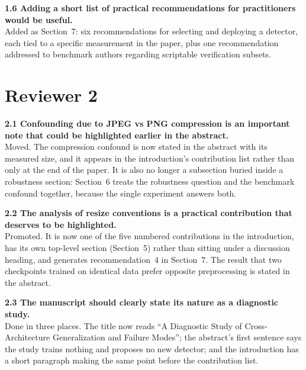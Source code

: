 \documentclass[11pt]{article}
\begin{document}
\noindent\textbf{1.6 Adding a short list of practical recommendations for
practitioners would be useful.}\\[1pt]
Added as Section~7: six recommendations for
selecting and deploying a detector, each tied to a specific measurement in
the paper, plus one recommendation addressed to benchmark authors
regarding scriptable verification subsets.

\section*{Reviewer 2}

\noindent\textbf{2.1 Confounding due to JPEG vs PNG compression is an
important note that could be highlighted earlier in the abstract.}\\[1pt]
Moved. The compression confound is now stated in the abstract with its
measured size, and it appears in the introduction's contribution list
rather than only at the end of the paper. It is also no longer a
subsection buried inside a robustness section: Section~6
treats the robustness question and the benchmark confound together,
because the single experiment answers both.

\noindent\textbf{2.2 The analysis of resize conventions is a practical
contribution that deserves to be highlighted.}\\[1pt]
Promoted. It is now one of the five numbered contributions in the
introduction, has its own top-level section
(Section~5) rather than sitting under a discussion
heading, and generates recommendation~4 in
Section~7. The result that two checkpoints trained
on identical data prefer opposite preprocessing is stated in the abstract.

\noindent\textbf{2.3 The manuscript should clearly state its nature as a
diagnostic study.}\\[1pt]
Done in three places. The title now reads ``A Diagnostic Study of
Cross-Architecture Generalization and Failure Modes''; the abstract's first
sentence says the study trains nothing and proposes no new detector; and
the introduction has a short paragraph making the same point before the
contribution list.
\end{document}
